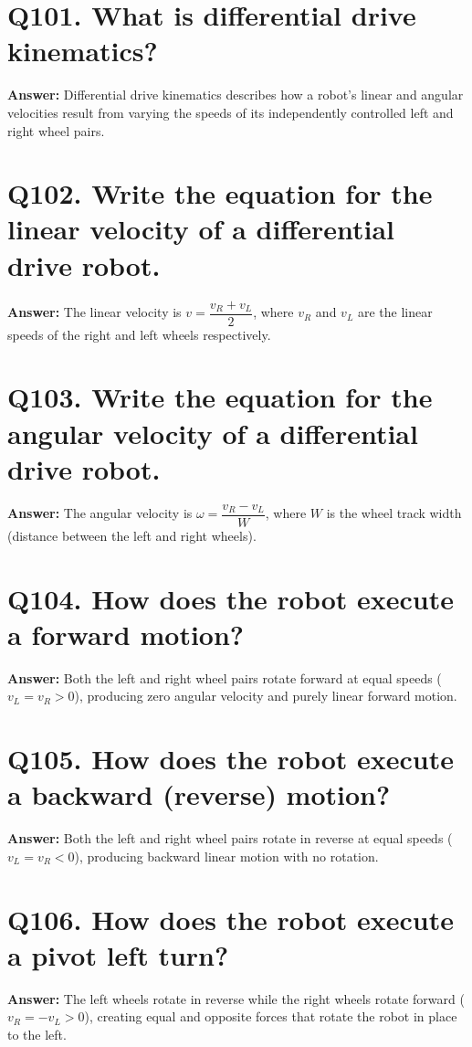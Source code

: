 \documentclass[12pt,a4paper,oneside]{report}
\begin{document}
\section{Q101. What is differential drive kinematics?}
\textbf{Answer:} Differential drive kinematics describes how a robot's linear and angular velocities result from varying the speeds of its independently controlled left and right wheel pairs.

\section{Q102. Write the equation for the linear velocity of a differential drive robot.}
\textbf{Answer:} The linear velocity is $v = \dfrac{v_R + v_L}{2}$, where $v_R$ and $v_L$ are the linear speeds of the right and left wheels respectively.

\section{Q103. Write the equation for the angular velocity of a differential drive robot.}
\textbf{Answer:} The angular velocity is $\omega = \dfrac{v_R - v_L}{W}$, where $W$ is the wheel track width (distance between the left and right wheels).

\section{Q104. How does the robot execute a forward motion?}
\textbf{Answer:} Both the left and right wheel pairs rotate forward at equal speeds ($v_L = v_R > 0$), producing zero angular velocity and purely linear forward motion.

\section{Q105. How does the robot execute a backward (reverse) motion?}
\textbf{Answer:} Both the left and right wheel pairs rotate in reverse at equal speeds ($v_L = v_R < 0$), producing backward linear motion with no rotation.

\section{Q106. How does the robot execute a pivot left turn?}
\textbf{Answer:} The left wheels rotate in reverse while the right wheels rotate forward ($v_R = -v_L > 0$), creating equal and opposite forces that rotate the robot in place to the left.
\end{document}

